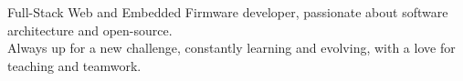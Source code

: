 \documentclass[9pt]{developercv} %
\begin{document}
\vspace{0.4cm}



\begin{minipage}[t]{0.4\textwidth} %
	\vspace{-\baselineskip} %
	
	Full-Stack Web and Embedded Firmware developer, passionate about software architecture and open-source.\\
        Always up for a new challenge, constantly learning and evolving, with a love for teaching and teamwork.
\end{minipage}
\hfill %
\begin{minipage}[t]{0.5\textwidth} %
	\vspace{-\baselineskip} %
	\begin{barchart}{5.5}
	\end{barchart}
\end{minipage}

\vspace{0.4cm}
\end{document}
